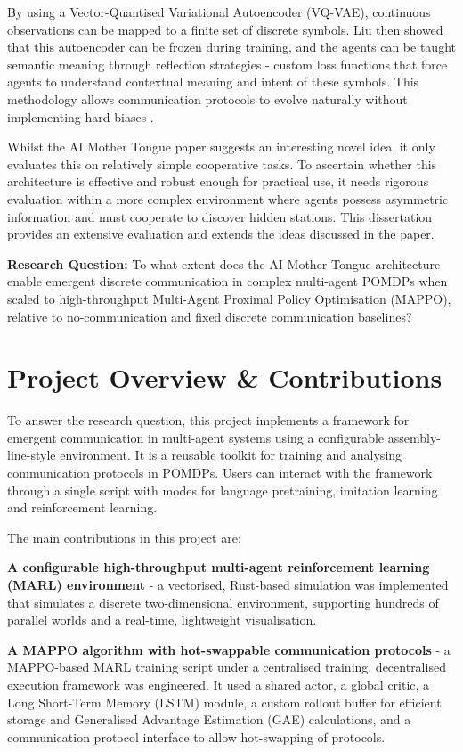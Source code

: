 By using a Vector-Quantised Variational Autoencoder (VQ-VAE), continuous observations can be mapped to a finite set of discrete symbols.
Liu \cite{AIMotherTongue} then showed that this autoencoder can be frozen during training, and the agents can be taught semantic meaning through reflection strategies - custom loss functions that force agents to understand contextual meaning and intent of these symbols.
This methodology allows communication protocols to evolve naturally without implementing hard biases \cite{Biases}.

Whilst the AI Mother Tongue \cite{AIMotherTongue} paper suggests an interesting novel idea, it only evaluates this on relatively simple cooperative tasks.
To ascertain whether this architecture is effective and robust enough for practical use, it needs rigorous evaluation within a more complex environment where agents possess asymmetric information and must cooperate to discover hidden stations.
This dissertation provides an extensive evaluation and extends the ideas discussed in the paper.

\textbf{Research Question:} To what extent does the AI Mother Tongue architecture enable emergent discrete communication in complex multi-agent POMDPs when scaled to high-throughput Multi-Agent Proximal Policy Optimisation (MAPPO), relative to no-communication and fixed discrete communication baselines?

\section{Project Overview \& Contributions}
\label{sec:1.1}

To answer the research question, this project implements a framework for emergent communication in multi-agent systems using a configurable assembly-line-style environment.
It is a reusable toolkit for training and analysing communication protocols in POMDPs.
Users can interact with the framework through a single script with modes for language pretraining, imitation learning and reinforcement learning.

The main contributions in this project are:

\textbf{A configurable high-throughput multi-agent reinforcement learning (MARL) environment} - a vectorised, Rust-based simulation was implemented that simulates a discrete two-dimensional environment, supporting hundreds of parallel worlds and a real-time, lightweight visualisation.

\textbf{A MAPPO algorithm with hot-swappable communication protocols} - a MAPPO-based MARL training script under a centralised training, decentralised execution framework was engineered.
It used a shared actor, a global critic, a Long Short-Term Memory (LSTM) module, a custom rollout buffer for efficient storage and Generalised Advantage Estimation (GAE) calculations, and a communication protocol interface to allow hot-swapping of protocols.

